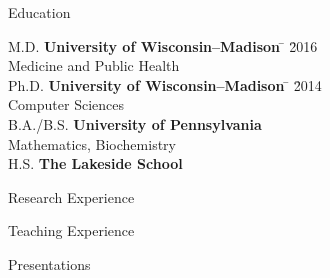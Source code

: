 \documentclass{resume2} %
\begin{document}

\begin{rSection}{Education}

\begin{tabbing}
M.D.  \hspace*{2.32 em}\= \textbf{University of Wisconsin--Madison} \hspace*{5em} \= \hspace*{15em} \= 2016\\
\> Medicine and Public Health \\
Ph.D. \hspace*{2 em}\= \textbf{University of Wisconsin--Madison} \hspace*{5em} \= \hspace*{15em} \= 2014\\
\> Computer Sciences \\
%
B.A./B.S. \hspace*{2 em}\> \textbf{University of Pennsylvania} \>  \\
\> Mathematics, Biochemistry \\
%
H.S.\hspace*{2 em}\> \textbf{The Lakeside School} \>  \\
\end{tabbing}
\end{rSection}

\begin{rSection}{Research Experience}

\end{rSection}

\begin{rSection}{Teaching Experience}

\end{rSection}

\begin{rSection}{Presentations}

\end{rSection}
\end{document}
